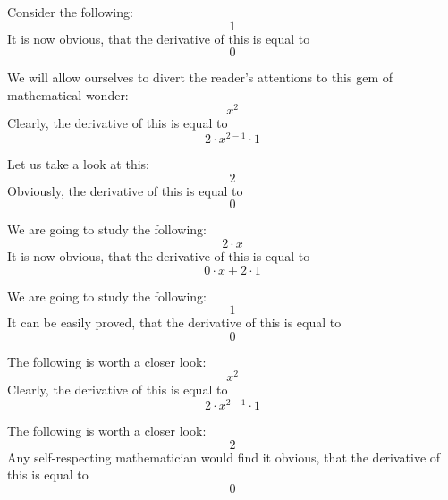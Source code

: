 \documentclass{article}
\begin{document}
Consider the following:
\begin{equation}
1 
\end{equation}
It is now obvious, that the derivative of this is equal to
\begin{equation}
0 
\end{equation}

We will allow ourselves to divert the reader's attentions to this gem of mathematical wonder:
\begin{equation}
x ^{2 } 
\end{equation}
Clearly, the derivative of this is equal to
\begin{equation}
2 \cdot x ^{2 - 1 } \cdot 1 
\end{equation}

Let us take a look at this:
\begin{equation}
2 
\end{equation}
Obviously, the derivative of this is equal to
\begin{equation}
0 
\end{equation}

We are going to study the following:
\begin{equation}
2 \cdot x 
\end{equation}
It is now obvious, that the derivative of this is equal to
\begin{equation}
0 \cdot x + 2 \cdot 1 
\end{equation}

We are going to study the following:
\begin{equation}
1 
\end{equation}
It can be easily proved, that the derivative of this is equal to
\begin{equation}
0 
\end{equation}

The following is worth a closer look:
\begin{equation}
x ^{2 } 
\end{equation}
Clearly, the derivative of this is equal to
\begin{equation}
2 \cdot x ^{2 - 1 } \cdot 1 
\end{equation}

The following is worth a closer look:
\begin{equation}
2 
\end{equation}
Any self-respecting mathematician would find it obvious, that the derivative of this is equal to
\begin{equation}
0 
\end{equation}
\end{document}

